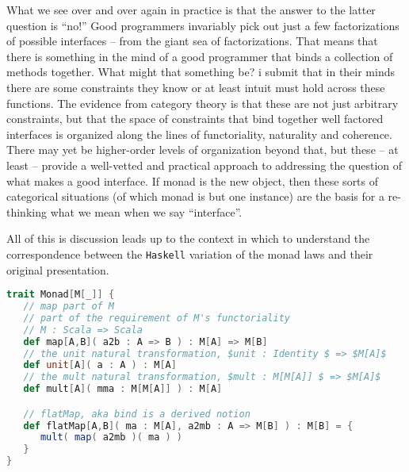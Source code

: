 What we see over and over again in practice is that the answer to
the latter question is ``no!'' Good programmers invariably pick out just a
few factorizations of possible interfaces -- from the giant sea of
factorizations. That means that there is something in the mind of a
good programmer that binds a collection of methods together. What
might that something be? i submit that in their minds there are some
constraints they know or at least intuit must hold across these
functions. The evidence from category theory is that these are not
just arbitrary constraints, but that the space of constraints that
bind together well factored interfaces is organized along the lines of
functoriality, naturality and coherence. There may yet be higher-order
levels of organization beyond that, but these -- at least -- provide a
well-vetted and practical approach to addressing the question of what
makes a good interface. If monad is the new object, then these sorts
of categorical situations (of which monad is but one instance) are the
basis for a re-thinking what we mean when we say ``interface''.

All of this is discussion leads up to the context in which to
understand the correspondence between the \texttt{Haskell} variation
of the monad laws and their original presentation. 

\break
\begin{lstlisting}[language=Scala,mathescape=true,frame=single,caption={categorical presentation of monad as Scala trait},captionpos=b]
trait Monad[M[_]] {
   // map part of M 
   // part of the requirement of M's functoriality
   // M : Scala => Scala
   def map[A,B]( a2b : A => B ) : M[A] => M[B]   
   // the unit natural transformation, $unit : Identity $ => $M[A]$
   def unit[A]( a : A ) : M[A]
   // the mult natural transformation, $mult : M[M[A]] $ => $M[A]$   
   def mult[A]( mma : M[M[A]] ) : M[A]

   // flatMap, aka bind is a derived notion
   def flatMap[A,B]( ma : M[A], a2mb : A => M[B] ) : M[B] = {
      mult( map( a2mb )( ma ) )
   }
}
\end{lstlisting}








